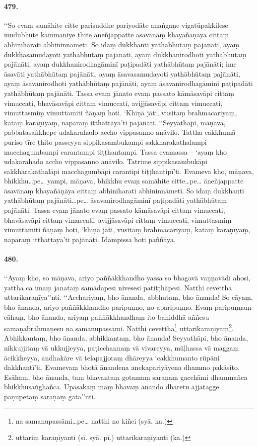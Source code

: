 \paragraph{479.} ‘‘So evaṃ samāhite citte parisuddhe pariyodāte anaṅgaṇe vigatūpakkilese mudubhūte kammaniye ṭhite āneñjappatte āsavānaṃ khayañāṇāya cittaṃ abhinīharati abhininnāmeti. So idaṃ dukkhanti yathābhūtaṃ pajānāti, ayaṃ dukkhasamudayoti yathābhūtaṃ pajānāti, ayaṃ dukkhanirodhoti yathābhūtaṃ pajānāti, ayaṃ dukkhanirodhagāminī paṭipadāti yathābhūtaṃ pajānāti; ime āsavāti yathābhūtaṃ pajānāti, ayaṃ āsavasamudayoti yathābhūtaṃ pajānāti, ayaṃ āsavanirodhoti yathābhūtaṃ pajānāti, ayaṃ āsavanirodhagāminī paṭipadāti yathābhūtaṃ pajānāti. Tassa evaṃ jānato evaṃ passato kāmāsavāpi cittaṃ vimuccati, bhavāsavāpi cittaṃ vimuccati, avijjāsavāpi cittaṃ vimuccati, vimuttasmiṃ vimuttamiti ñāṇaṃ hoti. ‘Khīṇā jāti, vusitaṃ brahmacariyaṃ, kataṃ karaṇīyaṃ, nāparaṃ itthattāyā’ti pajānāti. ‘‘Seyyathāpi, māṇava, pabbatasaṅkhepe udakarahado accho vippasanno anāvilo. Tattha cakkhumā puriso tīre ṭhito passeyya sippikasambukampi sakkharakathalampi macchagumbampi carantampi tiṭṭhantampi. Tassa evamassa – ‘ayaṃ kho udakarahado accho vippasanno anāvilo. Tatrime sippikasambukāpi sakkharakathalāpi macchagumbāpi carantipi tiṭṭhantipī’ti. Evameva kho, māṇava, bhikkhu…pe… yampi, māṇava, bhikkhu evaṃ samāhite citte…pe… āneñjappatte āsavānaṃ khayañāṇāya cittaṃ abhinīharati abhininnāmeti. So idaṃ dukkhanti yathābhūtaṃ pajānāti…pe… āsavanirodhagāminī paṭipadāti yathābhūtaṃ pajānāti. Tassa evaṃ jānato evaṃ passato kāmāsavāpi cittaṃ vimuccati, bhavāsavāpi cittaṃ vimuccati, avijjāsavāpi cittaṃ vimuccati, vimuttasmiṃ vimuttamiti ñāṇaṃ hoti, ‘khīṇā jāti, vusitaṃ brahmacariyaṃ, kataṃ karaṇīyaṃ, nāparaṃ itthattāyā’ti pajānāti. Idampissa hoti paññāya.

\paragraph{480.} ‘‘Ayaṃ kho, so māṇava, ariyo paññākkhandho yassa so bhagavā vaṇṇavādī ahosi, yattha ca imaṃ janataṃ samādapesi nivesesi patiṭṭhāpesi. Natthi cevettha uttarikaraṇīya’’nti. ‘‘Acchariyaṃ, bho ānanda, abbhutaṃ, bho ānanda! So cāyaṃ, bho ānanda, ariyo paññākkhandho paripuṇṇo, no aparipuṇṇo. Evaṃ paripuṇṇaṃ cāhaṃ, bho ānanda, ariyaṃ paññākkhandhaṃ ito bahiddhā aññesu samaṇabrāhmaṇesu na samanupassāmi. Natthi cevettha\footnote{na samanupassāmi…pe… natthi no kiñci (syā. ka.)} uttarikaraṇīyaṃ\footnote{uttariṃ karaṇīyanti (sī. syā. pī.) uttarikaraṇīyanti (ka.)}. Abhikkantaṃ, bho ānanda, abhikkantaṃ, bho ānanda! Seyyathāpi, bho ānanda, nikkujjitaṃ vā ukkujjeyya, paṭicchannaṃ vā vivareyya, mūḷhassa vā maggaṃ ācikkheyya, andhakāre vā telapajjotaṃ dhāreyya ‘cakkhumanto rūpāni dakkhantī’ti. Evamevaṃ bhotā ānandena anekapariyāyena dhammo pakāsito. Esāhaṃ, bho ānanda, taṃ bhavantaṃ gotamaṃ saraṇaṃ gacchāmi dhammañca bhikkhusaṅghañca. Upāsakaṃ maṃ bhavaṃ ānando dhāretu ajjatagge pāṇupetaṃ saraṇaṃ gata’’nti.

